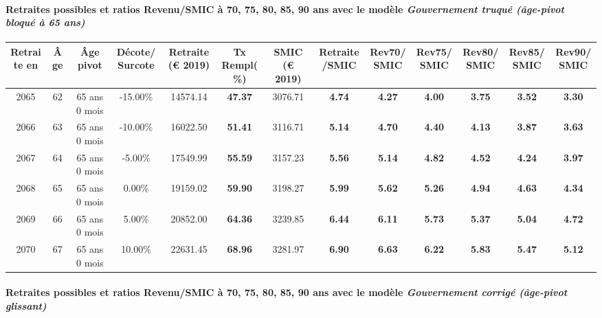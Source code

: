 \paragraph{Retraites possibles et ratios Revenu/SMIC à 70, 75, 80, 85, 90 ans avec le modèle \emph{Gouvernement truqué (âge-pivot bloqué à 65 ans)}}  
 
{ \scriptsize \begin{center} 
\begin{tabular}[htb]{|c|c||c|c||c|c||c||c|c|c|c|c|c|} 
\hline 
 Retraite en &  Âge &  Âge pivot &  Décote/Surcote &  Retraite (\euro{} 2019) &  Tx Rempl(\%) &  SMIC (\euro{} 2019) &  Retraite/SMIC &  Rev70/SMIC &  Rev75/SMIC &  Rev80/SMIC &  Rev85/SMIC &  Rev90/SMIC \\ 
\hline \hline 
 2065 &  62 &  65 ans 0 mois &  -15.00\% &  14574.14 &  {\bf 47.37} &  3076.71 &  {\bf 4.74} &  {\bf 4.27} &  {\bf 4.00} &  {\bf 3.75} &  {\bf 3.52} &  {\bf 3.30} \\ 
\hline 
 2066 &  63 &  65 ans 0 mois &  -10.00\% &  16022.50 &  {\bf 51.41} &  3116.71 &  {\bf 5.14} &  {\bf 4.70} &  {\bf 4.40} &  {\bf 4.13} &  {\bf 3.87} &  {\bf 3.63} \\ 
\hline 
 2067 &  64 &  65 ans 0 mois &  -5.00\% &  17549.99 &  {\bf 55.59} &  3157.23 &  {\bf 5.56} &  {\bf 5.14} &  {\bf 4.82} &  {\bf 4.52} &  {\bf 4.24} &  {\bf 3.97} \\ 
\hline 
 2068 &  65 &  65 ans 0 mois &  0.00\% &  19159.02 &  {\bf 59.90} &  3198.27 &  {\bf 5.99} &  {\bf 5.62} &  {\bf 5.26} &  {\bf 4.94} &  {\bf 4.63} &  {\bf 4.34} \\ 
\hline 
 2069 &  66 &  65 ans 0 mois &  5.00\% &  20852.00 &  {\bf 64.36} &  3239.85 &  {\bf 6.44} &  {\bf 6.11} &  {\bf 5.73} &  {\bf 5.37} &  {\bf 5.04} &  {\bf 4.72} \\ 
\hline 
 2070 &  67 &  65 ans 0 mois &  10.00\% &  22631.45 &  {\bf 68.96} &  3281.97 &  {\bf 6.90} &  {\bf 6.63} &  {\bf 6.22} &  {\bf 5.83} &  {\bf 5.47} &  {\bf 5.12} \\ 
\hline 
\hline 
\end{tabular} 
\end{center} } 
\paragraph{Retraites possibles et ratios Revenu/SMIC à 70, 75, 80, 85, 90 ans avec le modèle \emph{Gouvernement corrigé (âge-pivot glissant)}}  
 
